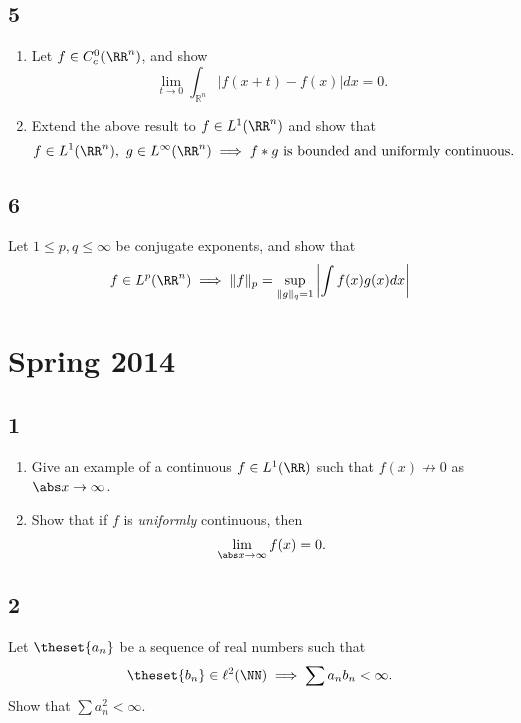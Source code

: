 \hypertarget{section-4}{%
\subsection{5}\label{section-4}}

\begin{enumerate}
\def\labelenumi{\arabic{enumi}.}
\item
  Let \(f \in C_c^0(\RR^n)\), and show \[
  \lim _{t \rightarrow 0} \int_{\mathbb{R}^{n}}|f(x+t)-f(x)| d x=0.
  \]
\item
  Extend the above result to \(f\in L^1(\RR^n)\) and show that \[
  f\in L^1(\RR^n),~ g\in L^\infty(\RR^n) \implies f \ast g \text{ is bounded and uniformly continuous. }
  \]
\end{enumerate}

\hypertarget{section-5}{%
\subsection{6}\label{section-5}}

Let \(1 \leq p,q \leq \infty\) be conjugate exponents, and show that \[
f \in L^p(\RR^n) \implies \|f\|_{p}=\sup _{\|g\|_{q}=1}\left|\int f(x) g(x) d x\right|
\]

\hypertarget{spring-2014}{%
\section{Spring 2014}\label{spring-2014}}

\hypertarget{section}{%
\subsection{1}\label{section}}

\begin{enumerate}
\def\labelenumi{\arabic{enumi}.}
\item
  Give an example of a continuous \(f\in L^1(\RR)\) such that
  \(f(x) \not\to 0\) as\(\abs x \to \infty\).
\item
  Show that if \(f\) is \emph{uniformly} continuous, then \[
  \lim_{\abs x \to \infty} f(x) = 0.
  \]
\end{enumerate}

\hypertarget{section-1}{%
\subsection{2}\label{section-1}}

Let \(\theset{a_n}\) be a sequence of real numbers such that \[
\theset{b_n} \in \ell^2(\NN) \implies \sum a_n b_n < \infty.
\] Show that \(\sum a_n^2 < \infty\).

